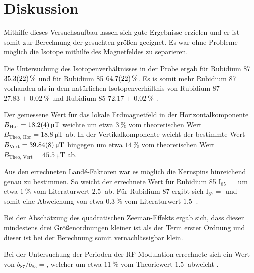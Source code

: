 \FloatBarrier
\section{Diskussion} %
\label{sec:diskussion}

Mithilfe dieses Versuchsaufbau lassen sich gute Ergebnisse erzielen und er ist somit zur Berechnung der gesuchten größen geeignet.
Es war ohne Probleme möglich die Isotope mithilfe des Magnetfeldes zu separieren.

Die Untersuchung des Isotopenverhältnisses in der Probe ergab für Rubidium 87 $\SI{35.3 \pm 2.2}{\percent}$ und für Rubidium 85 $\SI{64.7 \pm 2.2}{\percent}$.
Es is somit mehr Rubidium 87 vorhanden als in dem natürlichen Isotopenverhältnis von Rubidium 87 $\SI{27.83(2)}{\percent}$ \cite{spin_rubidium} und Rubidium 85 $\SI{72.17(2)}{\percent}$ \cite{spin_rubidium}.

Der gemessene Wert für das lokale Erdmagnetfeld in der Horizontalkomponente $B_\text{Hor} = \SI{18.2 \pm 0.4}{\micro\tesla}$ weichte um etwa $\SI{3}{\percent}$ vom theoretischen Wert $B_\text{Theo, Hor} = \SI{18.8}{\micro\tesla}$ \cite{earth_magnetism} ab.
In der Vertikalkomponente weicht der bestimmte Wert $B_\text{Vert} = \SI{39.84 \pm 0.08}{\micro\tesla}$ hingegen um etwa $\SI{14}{\percent}$ vom theoretischen Wert $B_\text{Theo, Vert} = \SI{45.5}{\micro\tesla}$ \cite{earth_magnetism} ab.

Aus den errechneten Landé-Faktoren war es möglich die Kernspins hinreichend genau zu bestimmen.
So weicht der errechnete Wert für Rubidium 85 $\text{I}_\text{85} = $ um etwa $\SI{1}{\percent}$ vom Literaturwert $\SI{2.5}{}$ \cite{spin_rubidium} ab.
Für Rubidium 87 ergibt sich $\text{I}_\text{87} = $ und somit eine Abweichung von etwa $\SI{0.3}{\percent}$ vom Literaturwert $\SI{1.5}{}$ \cite{spin_rubidium}.

Bei der Abschätzung des quadratischen Zeeman-Effekts ergab sich, dass dieser mindestens drei Größenordnungen kleiner ist als der Term erster Ordnung und dieser ist bei der Berechnung somit vernachlässigbar klein.

Bei der Untersuchung der Perioden der RF-Modulation errechnete sich ein Wert von $b_\text{87}/b_\text{85} = $, welcher um etwa $\SI{11}{\percent}$ vom Theoriewert $\SI{1.5}{}$ abweicht \cite{V21}.
